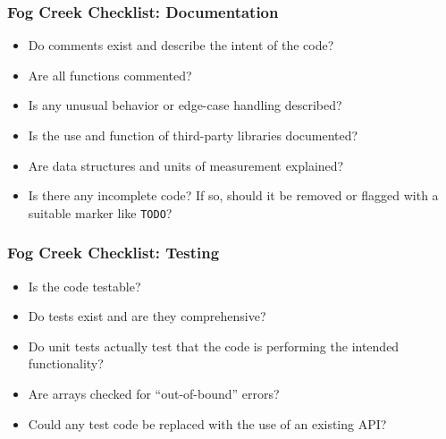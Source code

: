 \begin{frame}
\frametitle{Fog Creek Checklist: Documentation}
\begin{changemargin}{1cm}

\begin{itemize}
\item Do comments exist and describe the intent of the code?
\item Are all functions commented?
\item Is any unusual behavior or edge-case handling described?
\item Is the use and function of third-party libraries documented?
\item Are data structures and units of measurement explained?
\item Is there any incomplete code? If so, should it be removed or flagged with a suitable marker like \texttt{TODO}?
\end{itemize}

\end{changemargin}

\end{frame}

\begin{frame}
\frametitle{Fog Creek Checklist: Testing}
\begin{changemargin}{1cm}

\begin{itemize}
\item Is the code testable?
\item Do tests exist and are they comprehensive?
\item Do unit tests actually test that the code is performing the intended functionality?
\item Are arrays checked for ``out-of-bound'' errors?
\item Could any test code be replaced with the use of an existing API?
\end{itemize}

\end{changemargin}

\end{frame}




